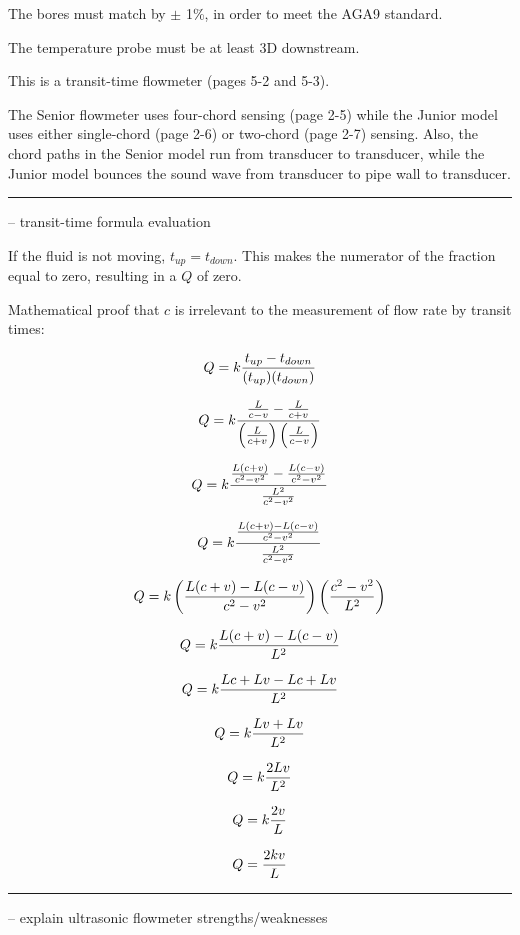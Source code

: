\begin{itemize}
\begin{itemize}
\vskip 10pt

The bores must match by $\pm$ 1\%, in order to meet the AGA9 standard.

\vskip 10pt

The temperature probe must be at least 3D downstream.

\vskip 10pt

This is a transit-time flowmeter (pages 5-2 and 5-3).

\vskip 10pt

The Senior flowmeter uses four-chord sensing (page 2-5) while the Junior model uses either single-chord (page 2-6) or two-chord (page 2-7) sensing.  Also, the chord paths in the Senior model run from transducer to transducer, while the Junior model bounces the sound wave from transducer to pipe wall to transducer.


\filbreak \vskip 5pt \hrule \vskip 5pt  -- transit-time formula evaluation \vskip 10pt

If the fluid is not moving, $t_{up} = t_{down}$.  This makes the numerator of the fraction equal to zero, resulting in a $Q$ of zero.

\vskip 10pt

Mathematical proof that $c$ is irrelevant to the measurement of flow rate by transit times:

$$Q = k {t_{up} - t_{down} \over (t_{up})(t_{down})}$$

$$Q = k {{L \over c-v} - {L \over c+v} \over \left({L \over c+v}\right)  \left({L \over c-v}\right)}$$

$$Q = k {{L (c + v) \over c^2 - v^2} - {L (c - v) \over c^2 - v^2} \over {L^2 \over c^2 - v^2}}$$

$$Q = k {{L (c + v) - L (c - v) \over c^2 - v^2} \over {L^2 \over c^2 - v^2}}$$

$$Q = k \left({L (c + v) - L (c - v) \over c^2 - v^2}\right) \left({c^2 - v^2 \over L^2}\right) $$

$$Q = k {L (c + v) - L (c - v) \over L^2}$$

$$Q = k {Lc + Lv - Lc + Lv \over L^2}$$

$$Q = k {Lv + Lv \over L^2}$$

$$Q = k {2Lv \over L^2}$$

$$Q = k {2v \over L}$$

$$Q = {2kv \over L}$$


\filbreak \vskip 5pt \hrule \vskip 5pt  -- explain ultrasonic flowmeter strengths/weaknesses \vskip 10pt


\end{itemize}
\end{itemize}
